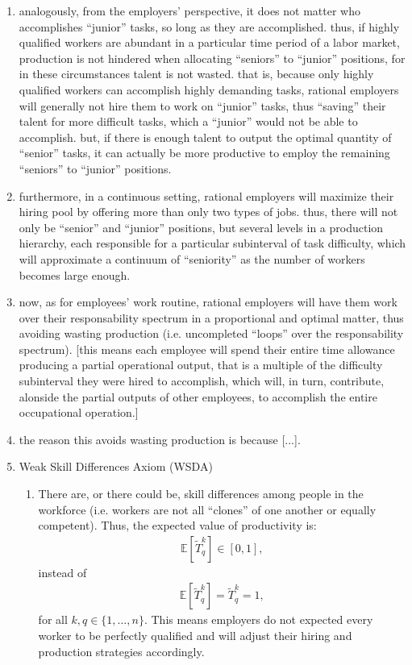 \documentclass[hidelinks, nonatbib]{elsarticle}
\begin{document}
\begin{enumerate}
    \item analogously, from the employers' perspective, it does not matter who accomplishes ``junior'' tasks, so long as they are accomplished. thus, if highly qualified workers are abundant in a particular time period of a labor market, production is not hindered when allocating ``seniors'' to ``junior'' positions, for in these circumstances talent is not wasted. that is, because only highly qualified workers can accomplish highly demanding tasks, rational employers will generally not hire them to work on ``junior'' tasks, thus ``saving'' their talent for more difficult tasks, which a ``junior'' would not be able to accomplish. but, if there is enough talent to output the optimal quantity of ``senior'' tasks, it can actually be more productive to employ the remaining ``seniors'' to ``junior'' positions.
    \item furthermore, in a continuous setting, rational employers will maximize their hiring pool by offering more than only two types of jobs. thus, there will not only be ``senior'' and ``junior'' positions, but several levels in a production hierarchy, each responsible for a particular subinterval of task difficulty, which will approximate a continuum of ``seniority'' as the number of workers becomes large enough.
    \item now, as for employees' work routine, rational employers will have them work over their responsability spectrum in a proportional and optimal matter, thus avoiding wasting production (i.e. uncompleted ``loops'' over the responsability spectrum). [this means each employee will spend their entire time allowance producing a partial operational output, that is a multiple of the difficulty subinterval they were hired to accomplish, which will, in turn, contribute, alonside the partial outputs of other employees, to accomplish the entire occupational operation.]
    \item the reason this avoids wasting production is because [...].
    \item Weak Skill Differences Axiom (WSDA)
    \begin{enumerate}
        \item There are, or there could be, skill differences among people in the workforce (i.e. workers are not all ``clones'' of one another or equally competent). Thus, the expected value of productivity is:
        \begin{gather}
            \mathbb{E}[
                \tilde{T}_{q}^{k}
            ]
            \in
            [0,1]
            ,
        \end{gather}
        instead of 
        \begin{gather}
            \mathbb{E}[
                \tilde{T}_{q}^{k}
            ]
            =
            \tilde{T}_{q}^{k}
            = 1
            ,
        \end{gather}
        for all $k,q \in \{1, \dots, n\}$. This means employers do not expected every worker to be perfectly qualified and will adjust their hiring and production strategies accordingly.
    \end{enumerate}


\end{enumerate}
\end{document}
